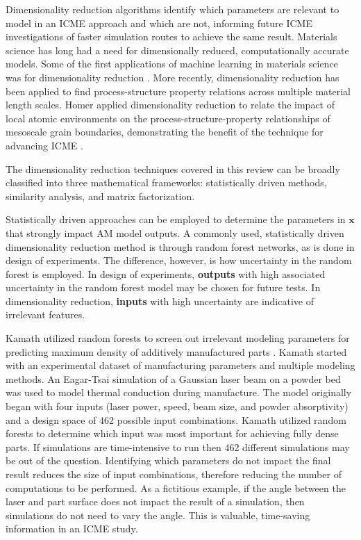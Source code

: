 Dimensionality reduction algorithms identify which parameters are relevant to model in an ICME approach and which are not, informing future ICME investigations of faster simulation routes to achieve the same result. Materials science has long had a need for dimensionally reduced, computationally accurate models. Some of the first applications of machine learning in materials science was for dimensionality reduction \cite{Fischer2006, Flores-Livas2017, Rupp2011, Snyder2012}. More recently, dimensionality reduction has been applied to find process-structure property relations across multiple material length scales. Homer applied dimensionality reduction to relate the impact of local atomic environments on the process-structure-property relationships of mesoscale grain boundaries, demonstrating the benefit of the technique for advancing ICME \cite{Homer2019}. 

The dimensionality reduction techniques covered in this review can be broadly classified into three mathematical frameworks: statistically driven methods, similarity analysis, and matrix factorization.

Statistically driven approaches can be employed to determine the parameters in $\mathbf{x}$ that strongly impact AM model outputs. A commonly used, statistically driven dimensionality reduction method is through random forest networks, as is done in design of experiments. The difference, however, is how uncertainty in the random forest is employed. In design of experiments, \textbf{outputs} with high associated uncertainty in the random forest model may be chosen for future tests. In dimensionality reduction, \textbf{inputs} with high uncertainty are indicative of irrelevant features.

Kamath utilized random forests to screen out irrelevant modeling parameters for predicting maximum density of additively manufactured parts \cite{Kamath2016}. Kamath started with an experimental dataset of manufacturing parameters and multiple modeling methods. An Eagar-Tsai simulation of a Gaussian laser beam on a powder bed was used to model thermal conduction during manufacture. The model originally began with four inputs (laser power, speed, beam size, and powder absorptivity) and a design space of 462 possible input combinations. Kamath utilized random forests to determine which input was most important for achieving fully dense parts. If simulations are time-intensive to run then 462 different simulations may be out of the question. Identifying which parameters do not impact the final result reduces the size of input combinations, therefore reducing the number of computations to be performed. As a fictitious example, if the angle between the laser and part surface does not impact the result of a simulation, then simulations do not need to vary the angle. This is valuable, time-saving information in an ICME study.

